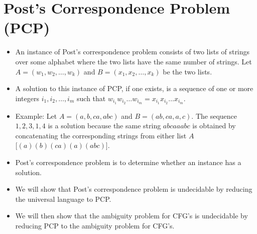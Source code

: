 \documentclass[]{article}
\begin{document}
\section{Post's Correspondence Problem (PCP)}
\begin{itemize}
\item An instance of Post's correspondence problem consists of two lists of
strings over some alphabet where the two lists have the same number of strings.
Let $A = (w_1, w_2, \ldots, w_k)$ and $B = (x_1, x_2, \ldots, x_k)$ be the two
lists.
\item A solution to this instance of PCP, if one exists, is a sequence of one or
more integers $i_1, i_2, \ldots, i_m$ such that $w_{i_1} w_{i_2} \ldots w_{i_m}
= x_{i_1} x_{i_2}\ldots x_{i_m}$.
\item Example: Let $A = (a, b, ca, abc)$ and $B = (ab, ca, a, c)$. The sequence
$1, 2, 3, 1, 4$ is a solution because the same string $abcaaabc$ is obtained by
concatenating the corresponding strings from either list $A$ $\lbrack
(a)(b)(ca)(a)(abc)\rbrack$.
\item Post's correspondence problem is to determine whether an instance has a
solution.
\item We will show that Post's correspondence problem is undecidable by reducing
the universal language to PCP.
\item We will then show that the ambiguity problem for CFG's is undecidable by
reducing PCP to the ambiguity problem for CFG's.
\end{itemize}
\end{document}
